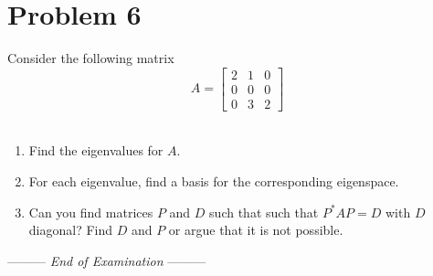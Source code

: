 \documentclass[a4paper,12pt,fleqn]{article}
\newcommand{\lastwords}{End of Examination}
\begin{document}
\section*{Problem 6}
Consider the following matrix
$$
A=\left[ \begin{array}{ccc} 2 & 1 & 0 \\ 0 & 0 & 0 \\ 0 & 3 & 2 \end{array} \right]
$$ \\
\begin{enumerate}
\item Find the eigenvalues for $A$.
\item For each eigenvalue, find a basis for the corresponding eigenspace.
\item Can you find matrices $P$ and $D$ such that such that $P^*AP=D$ with $D$ diagonal? Find $D$ and $P$ or argue that it is not possible.
\end{enumerate}


\begin{center}
\vspace{3cm}
--------- \textit{\lastwords} ---------
\end{center}


\label{finalpage}
\end{document}
